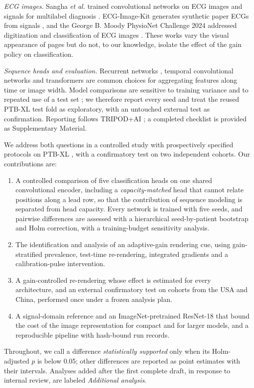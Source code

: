 \documentclass{wlscirep}
\begin{document}
\emph{ECG images.} Sangha \emph{et al.} trained convolutional networks on ECG images and signals for multilabel diagnosis \cite{sangha2022images}. ECG-Image-Kit generates synthetic paper ECGs from signals \cite{shivashankara2024ecgimagekit}, and the George B. Moody PhysioNet Challenge 2024 addressed digitization and classification of ECG images \cite{reyna2024challenge,krones2024hough}. These works vary the visual appearance of pages but do not, to our knowledge, isolate the effect of the gain policy on classification.

\emph{Sequence heads and evaluation.} Recurrent networks \cite{hochreiter1997lstm}, temporal convolutional networks \cite{bai2018tcn} and transformers \cite{vaswani2017attention,dosovitskiy2021vit} are common choices for aggregating features along time or image width. Model comparisons are sensitive to training variance \cite{bouthillier2021variance} and to repeated use of a test set \cite{varoquaux2022failures}; we therefore report every seed and treat the reused PTB-XL test fold as exploratory, with an untouched external test as confirmation. Reporting follows TRIPOD+AI \cite{collins2024tripodai}; a completed checklist is provided as Supplementary Material.

We address both questions in a controlled study with prospectively specified protocols on PTB-XL \cite{wagner2020ptbxl}, with a confirmatory test on two independent cohorts. Our contributions are:
\begin{enumerate}
\item A controlled comparison of five classification heads on one shared convolutional encoder, including a \emph{capacity-matched} head that cannot relate positions along a lead row, so that the contribution of sequence modeling is separated from head capacity. Every network is trained with five seeds, and pairwise differences are assessed with a hierarchical seed-by-patient bootstrap and Holm correction, with a training-budget sensitivity analysis.
\item The identification and analysis of an adaptive-gain rendering cue, using gain-stratified prevalence, test-time re-rendering, integrated gradients and a calibration-pulse intervention.
\item A gain-controlled re-rendering whose effect is estimated for every architecture, and an external confirmatory test on cohorts from the USA and China, performed once under a frozen analysis plan.
\item A signal-domain reference and an ImageNet-pretrained ResNet-18 that bound the cost of the image representation for compact and for larger models, and a reproducible pipeline with hash-bound run records.
\end{enumerate}
Throughout, we call a difference \emph{statistically supported} only when its Holm-adjusted $p$ is below 0.05; other differences are reported as point estimates with their intervals. Analyses added after the first complete draft, in response to internal review, are labeled \emph{Additional analysis}.
\end{document}
